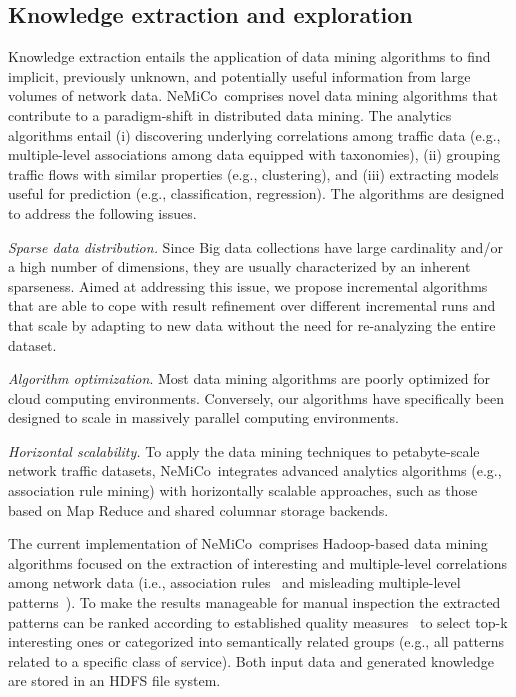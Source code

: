 \documentclass[conference]{IEEEtran}
\newcommand{\Nemico}{{\sc NeMiCo}}
\begin{document}
\subsection{Knowledge extraction and exploration}
\label{KnowExt}
Knowledge extraction entails the application of data mining algorithms to find implicit, previously unknown, and potentially useful information from large volumes of network data. 
\Nemico\ comprises novel data mining algorithms that contribute to a paradigm-shift in distributed data mining. The analytics algorithms entail (i) discovering underlying correlations among traffic data 
(e.g., multiple-level associations among data equipped with taxonomies), (ii) grouping traffic flows with similar properties (e.g., clustering), and (iii) extracting models useful for prediction (e.g., classification, regression).  
The algorithms are designed to address the following issues.

\textit{Sparse data distribution.} Since Big data collections have large cardinality and/or a high number of dimensions, they are usually characterized by an
inherent sparseness. Aimed at addressing this issue, we propose incremental algorithms that are able to cope with result refinement over different incremental runs
and that scale by adapting to new data without the need for re-analyzing the entire dataset.

\textit{Algorithm optimization}. Most data mining algorithms are poorly optimized for cloud computing environments. 
Conversely, our algorithms have specifically been designed to scale %
in massively parallel computing environments.

\textit{Horizontal scalability.} To apply the data mining techniques to petabyte-scale network traffic datasets, \Nemico\ integrates advanced analytics algorithms (e.g., association rule mining) with horizontally scalable approaches, 
such as those based on Map Reduce and shared columnar storage backends.

The current implementation of \Nemico\ comprises Hadoop-based data mining algorithms focused on the extraction of interesting and multiple-level correlations among network data (i.e., association rules~\cite{ISPA13} and 
misleading multiple-level patterns~\cite{ISPA14}). To make the results manageable for manual inspection the extracted patterns can be ranked according to established quality measures~\cite{libroKumar} 
to select top-k interesting ones or categorized into semantically related groups (e.g., all patterns related to a specific class of service).
Both input data and generated knowledge are stored in an HDFS file system. 
\end{document}

